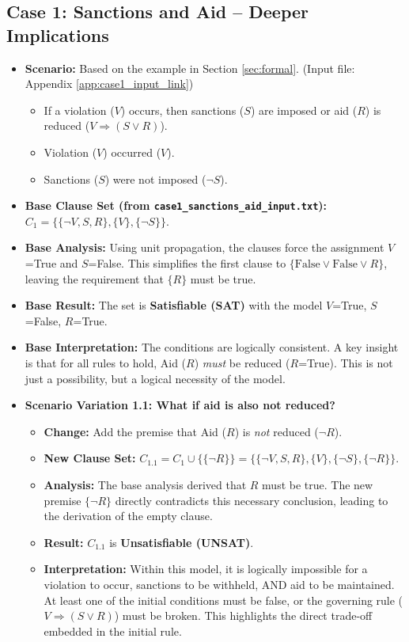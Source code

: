 \documentclass[11pt, a4paper]{article}
\begin{document}
\subsection*{Case 1: Sanctions and Aid – Deeper Implications}
\begin{itemize}
    \item \textbf{Scenario:} Based on the example in Section \ref{sec:formal}. (Input file: Appendix \ref{app:case1_input_link})
    \begin{itemize}
        \item If a violation ($V$) occurs, then sanctions ($S$) are imposed or aid ($R$) is reduced ($V \Rightarrow (S \vee R)$).
        \item Violation ($V$) occurred ($V$).
        \item Sanctions ($S$) were not imposed ($\neg S$).
    \end{itemize}
    \item \textbf{Base Clause Set (from \texttt{case1\_sanctions\_aid\_input.txt}):} $C_1 = \{\{\neg V, S, R\}, \{V\}, \{\neg S\}\}$.
    \item \textbf{Base Analysis:} Using unit propagation, the clauses force the assignment $V$=True and $S$=False. This simplifies the first clause to $\{\text{False} \vee \text{False} \vee R\}$, leaving the requirement that $\{R\}$ must be true.
    \item \textbf{Base Result:} The set is \textbf{Satisfiable (SAT)} with the model $V$=True, $S$=False, $R$=True.
    \item \textbf{Base Interpretation:} The conditions are logically consistent. A key insight is that for all rules to hold, Aid ($R$) \textit{must} be reduced ($R$=True). This is not just a possibility, but a logical necessity of the model.
    \item \textbf{Scenario Variation 1.1: What if aid is also not reduced?}
        \begin{itemize}
            \item \textbf{Change:} Add the premise that Aid ($R$) is \textit{not} reduced ($\neg R$).
            \item \textbf{New Clause Set:} $C_{1.1} = C_1 \cup \{\{\neg R\}\} = \{\{\neg V, S, R\}, \{V\}, \{\neg S\}, \{\neg R\}\}$.
            \item \textbf{Analysis:} The base analysis derived that $R$ must be true. The new premise $\{\neg R\}$ directly contradicts this necessary conclusion, leading to the derivation of the empty clause.
            \item \textbf{Result:} $C_{1.1}$ is \textbf{Unsatisfiable (UNSAT)}.
            \item \textbf{Interpretation:} Within this model, it is logically impossible for a violation to occur, sanctions to be withheld, AND aid to be maintained. At least one of the initial conditions must be false, or the governing rule ($V \Rightarrow (S \vee R)$) must be broken. This highlights the direct trade-off embedded in the initial rule.
        \end{itemize}
\end{itemize}
\end{document}
